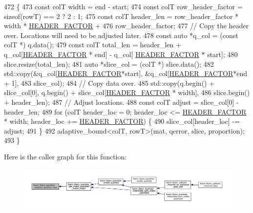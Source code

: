 \begin{DoxyCode}
472                                                                 \{
473   \textcolor{keyword}{const} colT width = end - start;
474   \textcolor{keyword}{const} colT row\_header\_factor = \textcolor{keyword}{sizeof}(rowT) == 2 ? 2 : 1;
475   \textcolor{keyword}{const} colT header\_len = row\_header\_factor * width * \hyperlink{classlbann_1_1lbann__quantizer_afb4315625e371169cabfac56c3f75d37}{HEADER\_FACTOR} +
476                           row\_header\_factor;
477   \textcolor{comment}{// Copy the header over. Locations will need to be adjusted later.}
478   \textcolor{keyword}{const} \textcolor{keyword}{auto} *q\_col = (\textcolor{keyword}{const} colT *) q.data();
479   \textcolor{keyword}{const} colT total\_len = header\_len + q\_col[\hyperlink{classlbann_1_1lbann__quantizer_afb4315625e371169cabfac56c3f75d37}{HEADER\_FACTOR} * end] - q\_col[
      \hyperlink{classlbann_1_1lbann__quantizer_afb4315625e371169cabfac56c3f75d37}{HEADER\_FACTOR} * start];
480   slice.resize(total\_len);
481   \textcolor{keyword}{auto} *slice\_col = (colT *) slice.data();
482   std::copy(&q\_col[\hyperlink{classlbann_1_1lbann__quantizer_afb4315625e371169cabfac56c3f75d37}{HEADER\_FACTOR}*start], &q\_col[\hyperlink{classlbann_1_1lbann__quantizer_afb4315625e371169cabfac56c3f75d37}{HEADER\_FACTOR}*end + 1],
483             slice\_col);
484   \textcolor{comment}{// Copy data over.}
485   std::copy(q.begin() + slice\_col[0], q.begin() + slice\_col[\hyperlink{classlbann_1_1lbann__quantizer_afb4315625e371169cabfac56c3f75d37}{HEADER\_FACTOR} * width],
486             slice.begin() + header\_len);
487   \textcolor{comment}{// Adjust locations.}
488   \textcolor{keyword}{const} colT adjust = slice\_col[0] - header\_len;
489   \textcolor{keywordflow}{for} (colT header\_loc = 0; header\_loc <= \hyperlink{classlbann_1_1lbann__quantizer_afb4315625e371169cabfac56c3f75d37}{HEADER\_FACTOR} * width; header\_loc += 
      \hyperlink{classlbann_1_1lbann__quantizer_afb4315625e371169cabfac56c3f75d37}{HEADER\_FACTOR}) \{
490     slice\_col[header\_loc] -= adjust;
491   \}
492   adaptive\_bound<colT, rowT>(mat, qerror, slice, proportion);
493 \}
\end{DoxyCode}
Here is the caller graph for this function\+:\nopagebreak
\begin{figure}[H]
\begin{center}
\leavevmode
\includegraphics[width=350pt]{classlbann_1_1lbann__quantizer_ab3a0e79b571e7c016446c179eedd0dc1_icgraph}
\end{center}
\end{figure}
\mbox{\label{classlbann_1_1lbann__quantizer_acf8d21e8114a00fdea53d919d76dd511}} 
